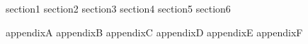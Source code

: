 \clearpage

\FloatBarrier
{section1}
\FloatBarrier
{section2}
\FloatBarrier
{section3}
\FloatBarrier
{section4}
\FloatBarrier
{section5}
\FloatBarrier
{section6}

\clearpage
{\small


}

\clearpage
\begin{subappendices}
{appendixA}
\clearpage
{appendixB}
\clearpage
{appendixC}
\clearpage
{appendixD}
\clearpage
{appendixE}
\clearpage
{appendixF}
\end{subappendices}
